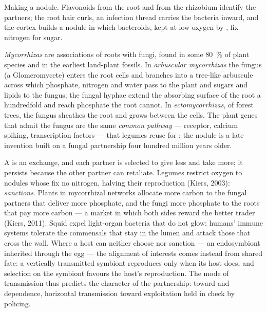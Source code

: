 \begin{omfigure}
{\small Making a nodule. Flavonoids from the root and  from
the rhizobium identify the partners; the root hair curls, an infection
thread carries the bacteria inward, and the cortex builds a nodule in
which bacteroids, kept at low oxygen by , fix nitrogen
for sugar.}
\end{omfigure}

\begin{definition}[Mycorrhizas]\label{def:b3:microbiomes:mycorrhiza}
\emph{Mycorrhizas} are associations of roots with fungi, found in some
\qty{80}{\%} of plant species and in the earliest land-plant fossils.
In \emph{arbuscular mycorrhizas} the fungus (a Glomeromycete) enters
the root cells and branches into a tree-like arbuscule across which
phosphate, nitrogen and water pass to the plant and sugars and lipids
to the fungus; the fungal hyphae extend the absorbing surface of the
root a hundredfold and reach phosphate the root cannot. In
\emph{ectomycorrhizas}, of forest trees, the fungus sheathes the root
and grows between the cells. The plant genes that admit the fungus are
the same \emph{common  pathway} --- receptor, calcium spiking,
transcription factors --- that legumes reuse for : the nodule
is a late invention built on a fungal partnership four hundred million
years older.
\end{definition}

\begin{proposition}\label{prop:b3:microbiomes:sanctions}
A  is an exchange, and each partner is selected to give less
and take more; it persists because the other partner can retaliate.
Legumes restrict oxygen to nodules whose  fix no nitrogen,
halving their reproduction (Kiers, 2003): \emph{sanctions}. Plants in
mycorrhizal networks allocate more carbon to the fungal partners that
deliver more phosphate, and the fungi more phosphate to the roots that
pay more carbon --- a market in which both sides reward the better
trader (Kiers, 2011). Squid expel light-organ bacteria that do not
glow; humans' immune systems tolerate the commensals that stay in the
lumen and attack those that cross the wall. Where a host can neither
choose nor sanction --- an endosymbiont inherited through the egg ---
the alignment of interests comes instead from shared fate: a
vertically transmitted symbiont reproduces only when its host does,
and selection on the symbiont favours the host's reproduction. The
mode of transmission thus predicts the character of the partnership:
 toward  and dependence, horizontal
transmission toward exploitation held in check by policing.
\end{proposition}
\admitted

